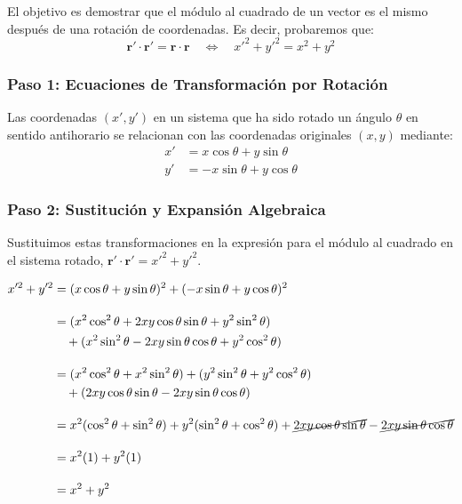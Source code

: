 \documentclass[11pt,a4paper]{article}
\begin{document}
El objetivo es demostrar que el módulo al cuadrado de un vector es el mismo después de una rotación de coordenadas. Es decir, probaremos que:
\[
\boldsymbol{r}' \cdot \boldsymbol{r}' = \boldsymbol{r} \cdot \boldsymbol{r} \quad \Leftrightarrow \quad x'^2 + y'^2 = x^2 + y^2
\]

\subsubsection*{Paso 1: Ecuaciones de Transformación por Rotación}
Las coordenadas $(x', y')$ en un sistema que ha sido rotado un ángulo $\theta$ en sentido antihorario se relacionan con las coordenadas originales $(x, y)$ mediante:
\begin{align*}
    x' &= x \cos\theta + y \sin\theta \\
    y' &= -x \sin\theta + y \cos\theta
\end{align*}

\subsubsection*{Paso 2: Sustitución y Expansión Algebraica}
Sustituimos estas transformaciones en la expresión para el módulo al cuadrado en el sistema rotado, $\boldsymbol{r}' \cdot \boldsymbol{r}' = x'^2 + y'^2$.

\begin{align*}
    x'^2 + y'^2 &= (x \cos\theta + y \sin\theta)^2 + (-x \sin\theta + y \cos\theta)^2 \\[1em]
    &= (x^2 \cos^2\theta + 2xy \cos\theta \sin\theta + y^2 \sin^2\theta) \\
    &\quad + (x^2 \sin^2\theta - 2xy \sin\theta \cos\theta + y^2 \cos^2\theta) \\[1em]
    &= (x^2 \cos^2\theta + x^2 \sin^2\theta) + (y^2 \sin^2\theta + y^2 \cos^2\theta) \\
    &\quad + (2xy \cos\theta \sin\theta - 2xy \sin\theta \cos\theta) \\[1em]
    &= x^2(\cos^2\theta + \sin^2\theta) + y^2(\sin^2\theta + \cos^2\theta) + \cancel{2xy \cos\theta \sin\theta} - \cancel{2xy \sin\theta \cos\theta} \\[1em]
    &= x^2(1) + y^2(1) \\[1em]
    &= x^2 + y^2
\end{align*}
\end{document}
